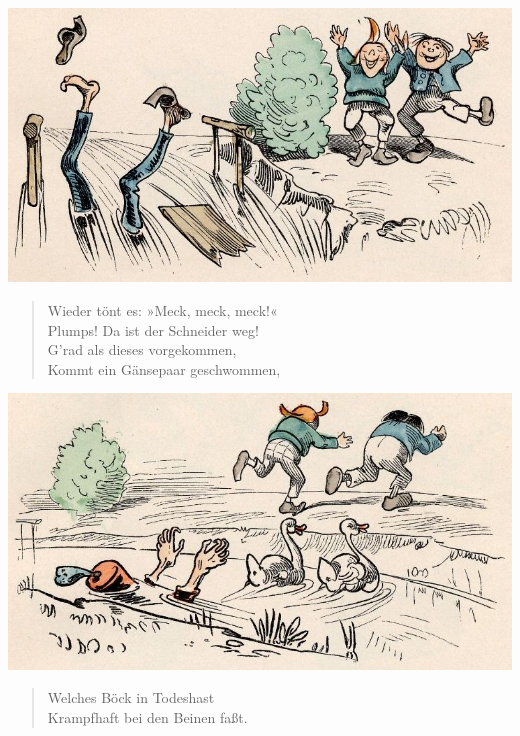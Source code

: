 \documentclass[a4paper,12pt]{article}
\begin{document}
\begin{center}\includegraphics[scale=.7, alt={... und dann ist er weg}]{images/3-07.jpg}\end{center}



\begin{verse}
Wieder tönt es: »Meck, meck, meck!«\\{}
Plumps! Da ist der Schneider weg!\\{}
G'rad als dieses vorgekommen,\\{}
Kommt ein Gänsepaar geschwommen,
\end{verse}



\begin{center}\includegraphics[scale=.7, alt={Mit den Gänsen}]{images/3-08.jpg}\end{center}



\begin{verse}
Welches Böck in Todeshast\\{}
Krampfhaft bei den Beinen faßt.
\end{verse}
\end{document}
